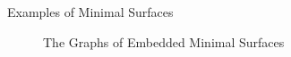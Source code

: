 \documentclass[final]{beamer}
\newlength{\colwidth}
\begin{document}
\begin{frame}[t]
\begin{columns}[t]
\begin{column}{\colwidth}
\begin{block}{Examples of Minimal Surfaces}
\begin{figure}
       \caption{The Graphs of Embedded Minimal Surfaces}
   \end{figure}
   \begin{figure}
       \centering

\end{figure}
\end{block}
\end{column}
\end{columns}
\end{frame}
\end{document}

